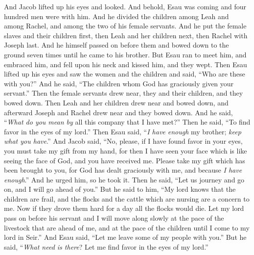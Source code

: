 \begin{biblechapter} %
 And Jacob lifted up his eyes and looked. And behold, Esau was coming and four hundred men were with him. And he divided the children among Leah and among Rachel, and among the two of his female servants.
\verse And he put the female slaves and their children first, then Leah and her children next, then Rachel with Joseph last.
\verse And he himself passed on before them and bowed down to the ground seven times until he came to his brother.
\verse But Esau ran to meet him, and embraced him, and fell upon his neck and kissed him, and they wept.
\verse Then Esau lifted up his eyes and saw the women and the children and said, “Who are these with you?” And he said, “The children whom God has graciously given your servant.”
\verse Then the female servants drew near, they and their children, and they bowed down.
\verse Then Leah and her children drew near and bowed down, and afterward Joseph and Rachel drew near and they bowed down.
\verse And he said, “\textit{What do you mean by} all this company that I have met?” Then he said, “To find favor in the eyes of my lord.”
\verse Then Esau said, “\textit{I have enough} my brother; \textit{keep what you have}.”
\verse And Jacob said, “No, please, if I have found favor in your eyes, you must take my gift from my hand, for then I have seen your face which is like seeing the face of God, and you have received me.
\verse Please take my gift which has been brought to you, for God has dealt graciously with me, and because \textit{I have enough}.” And he urged him, so he took it.
\verse Then he said, “Let us journey and go on, and I will go ahead of you.”
\verse But he said to him, “My lord knows that the children are frail, and the flocks and the cattle which are nursing are a concern to me. Now if they drove them hard for a day all the flocks would die.
\verse Let my lord pass on before his servant and I will move along slowly at the pace of the livestock that are ahead of me, and at the pace of the children until I come to my lord in Seir.”
\verse And Esau said, “Let me leave some of my people with you.” But he said, “\textit{What need is there}? Let me find favor in the eyes of my lord.”

\end{biblechapter}
